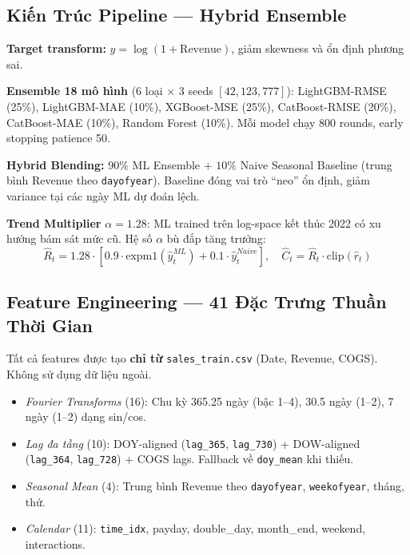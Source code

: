 \documentclass{article}
\begin{document}
\subsection*{Kiến Trúc Pipeline — Hybrid Ensemble}

\textbf{Target transform:} $y = \log(1 + \text{Revenue})$, giảm skewness và ổn định phương sai.

\textbf{Ensemble 18 mô hình} (6 loại $\times$ 3 seeds $[42, 123, 777]$): LightGBM-RMSE (25\%), LightGBM-MAE (10\%), XGBoost-MSE (25\%), CatBoost-RMSE (20\%), CatBoost-MAE (10\%), Random Forest (10\%). Mỗi model chạy 800 rounds, early stopping patience 50.

\textbf{Hybrid Blending:} $90\%$ ML Ensemble $+$ $10\%$ Naive Seasonal Baseline (trung bình Revenue theo \texttt{dayofyear}). Baseline đóng vai trò ``neo'' ổn định, giảm variance tại các ngày ML dự đoán lệch.

\textbf{Trend Multiplier} $\alpha = 1.28$: ML trained trên log-space kết thúc 2022 có xu hướng bám sát mức cũ. Hệ số $\alpha$ bù đắp tăng trưởng:
\[
\hat{R}_t = 1.28 \cdot \left[ 0.9 \cdot \text{expm1}(\hat{y}^{ML}_t) + 0.1 \cdot \hat{y}^{Naive}_t \right], \quad \hat{C}_t = \hat{R}_t \cdot \text{clip}(\hat{r}_t)
\]

\subsection*{Feature Engineering — 41 Đặc Trưng Thuần Thời Gian}

Tất cả features được tạo \textbf{chỉ từ} \texttt{sales\_train.csv} (Date, Revenue, COGS). Không sử dụng dữ liệu ngoài.

\begin{itemize}
    \setlength{\itemsep}{0pt}
    \item \textit{Fourier Transforms} (16): Chu kỳ 365.25 ngày (bậc 1--4), 30.5 ngày (1--2), 7 ngày (1--2) dạng sin/cos.
    \item \textit{Lag đa tầng} (10): DOY-aligned (\texttt{lag\_365}, \texttt{lag\_730}) + DOW-aligned (\texttt{lag\_364}, \texttt{lag\_728}) + COGS lags. Fallback về \texttt{doy\_mean} khi thiếu.
    \item \textit{Seasonal Mean} (4): Trung bình Revenue theo \texttt{dayofyear}, \texttt{weekofyear}, tháng, thứ.
    \item \textit{Calendar} (11): \texttt{time\_idx}, payday, double\_day, month\_end, weekend, interactions.
\end{itemize}
\end{document}
